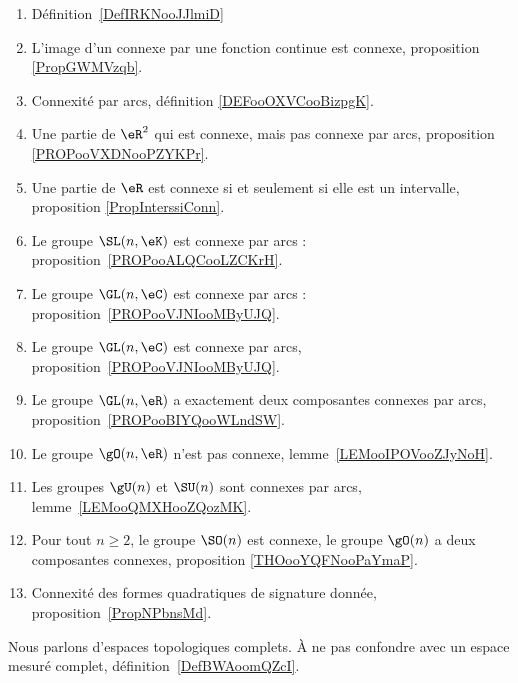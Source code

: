     \begin{enumerate}
        \item
            Définition~\ref{DefIRKNooJJlmiD}
        \item
            L'image d'un connexe par une fonction continue est connexe, proposition \ref{PropGWMVzqb}.
        \item
            Connexité par arcs, définition \ref{DEFooOXVCooBizpgK}.
        \item
            Une partie de \( \eR^2\) qui est connexe, mais pas connexe par arcs, proposition \ref{PROPooVXDNooPZYKPr}.
        \item
            Une partie de \( \eR\) est connexe si et seulement si elle est un intervalle, proposition \ref{PropInterssiConn}.
        \item
            Le groupe \( \SL(n,\eK)\) est connexe par arcs : proposition~\ref{PROPooALQCooLZCKrH}.
        \item
            Le groupe \( \GL(n,\eC)\) est connexe par arcs : proposition~\ref{PROPooVJNIooMByUJQ}.
        \item
            Le groupe \( \GL(n,\eC)\) est connexe par arcs, proposition~\ref{PROPooVJNIooMByUJQ}.
        \item
            Le groupe \( \GL(n,\eR)\) a exactement deux composantes connexes par arcs, proposition~\ref{PROPooBIYQooWLndSW}.
        \item
            Le groupe \( \gO(n,\eR)\) n'est pas connexe, lemme~\ref{LEMooIPOVooZJyNoH}.
        \item
            Les groupes \( \gU(n)\) et \( \SU(n)\) sont connexes par arcs, lemme~\ref{LEMooQMXHooZQozMK}.
        \item
            Pour tout \( n\geq 2\), le groupe \( \SO(n)\) est connexe, le groupe \( \gO(n)\) a deux composantes connexes, proposition \ref{THOooYQFNooPaYmaP}.
        \item
            Connexité des formes quadratiques de signature donnée, proposition~\ref{PropNPbnsMd}.
        \end{enumerate}

     \label{THMooOCXTooWenIJE}

Nous parlons d'espaces topologiques complets. À ne pas confondre avec un espace mesuré complet, définition~\ref{DefBWAoomQZcI}.


